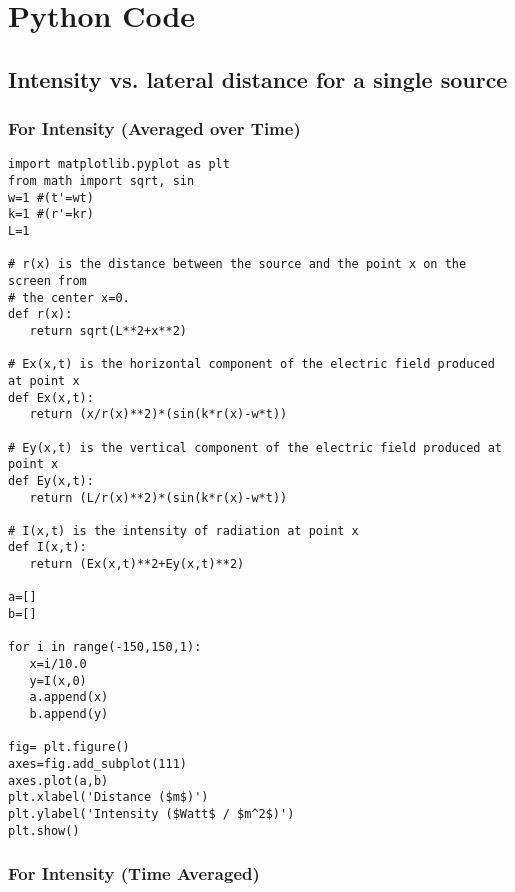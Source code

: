 \chapter{Python Code}

\section{Intensity vs. lateral distance for a single source}\label{code:single}

\subsection{For Intensity (Averaged over Time)}

\begin{Verbatim}[fontsize=\small,baselinestretch=0.9]
import matplotlib.pyplot as plt
from math import sqrt, sin
w=1 #(t'=wt)
k=1 #(r'=kr)
L=1

# r(x) is the distance between the source and the point x on the screen from 
# the center x=0.
def r(x):
   return sqrt(L**2+x**2)

# Ex(x,t) is the horizontal component of the electric field produced at point x 
def Ex(x,t):
   return (x/r(x)**2)*(sin(k*r(x)-w*t))

# Ey(x,t) is the vertical component of the electric field produced at point x 
def Ey(x,t):
   return (L/r(x)**2)*(sin(k*r(x)-w*t))

# I(x,t) is the intensity of radiation at point x
def I(x,t):
   return (Ex(x,t)**2+Ey(x,t)**2)

a=[]
b=[]

for i in range(-150,150,1):
   x=i/10.0
   y=I(x,0)
   a.append(x)
   b.append(y)

fig= plt.figure()
axes=fig.add_subplot(111)
axes.plot(a,b)
plt.xlabel('Distance ($m$)')
plt.ylabel('Intensity ($Watt$ / $m^2$)')
plt.show()
\end{Verbatim}

\subsection{For Intensity (Time Averaged)}

